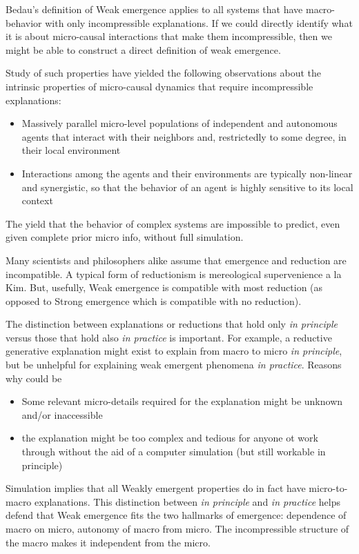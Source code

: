 \documentclass{article}
\newcommand{\ti}[1]{\textit{#1}}
\begin{document}
Bedau's definition of Weak emergence applies to all systems that have macro-behavior with only incompressible explanations. If we could directly identify what it is about micro-causal interactions that make them incompressible, then we might be able to construct a direct definition of weak emergence.

Study of such properties have yielded the following observations about the intrinsic properties of micro-causal dynamics that require incompressible explanations:

\begin{itemize}
    \item Massively parallel micro-level populations of independent and autonomous agents that interact with their neighbors and, restrictedly to some degree, in their local environment
    \item Interactions among the agents and their environments are typically non-linear and synergistic, so that the behavior of an agent is highly sensitive to its local context
\end{itemize}

The yield that the behavior of complex systems are impossible to predict, even given complete prior micro info, without full simulation.

Many scientists and philosophers alike assume that emergence and reduction are incompatible. A typical form of reductionism is mereological supervenience a la Kim. But, usefully, Weak emergence is compatible with most reduction (as opposed to Strong emergence which is compatible with no reduction).

The distinction between explanations or reductions that hold only \ti{in principle} versus those that hold also \ti{in practice} is important. For example, a reductive generative explanation might exist to explain from macro to micro \ti{in principle}, but be unhelpful for explaining weak emergent phenomena \ti{in practice}. Reasons why could be
\begin{itemize}
    \item Some relevant micro-details required for the explanation might be unknown and/or inaccessible
    \item the explanation might be too complex and tedious for anyone ot work through without the aid of a computer simulation (but still workable in principle)
\end{itemize}

Simulation implies that all Weakly emergent properties do in fact have micro-to-macro explanations. This distinction between \ti{in principle} and \ti{in practice} helps defend that Weak emergence fits the two hallmarks of emergence: dependence of macro on micro, autonomy of macro from micro. The incompressible structure of the macro makes it independent from the micro.
\end{document}
